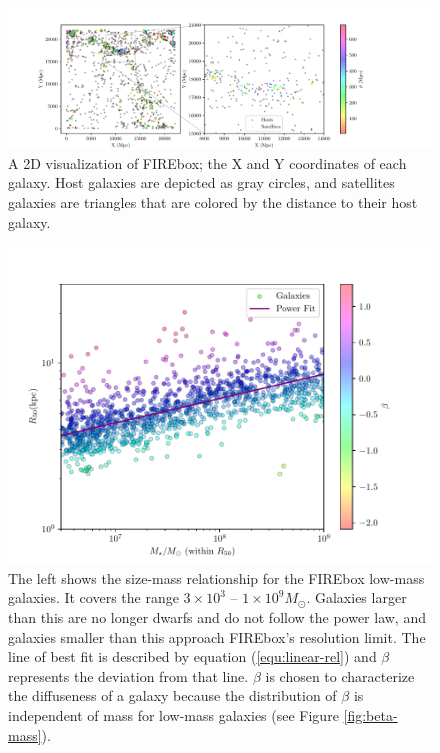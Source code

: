 \begin{figure}
    \centering
    \includegraphics*[width=\textwidth*11/10]{figs/me/locations.pdf}
    \caption*{
        A 2D visualization of FIREbox; the X and Y coordinates of each galaxy. Host galaxies are depicted as gray circles, and satellites galaxies are triangles that are colored by the distance to their host galaxy. 
    }
\end{figure}

\begin{figure}
    \centering
    \includegraphics[width=\textwidth*2/3]{figs/me/stars-mass-size-r50.pdf}
    \caption{
        The left shows the size-mass relationship for the FIREbox low-mass galaxies. It covers the range $3 \times 10^3$ -- $1 \times 10^9 M_\odot$. Galaxies larger than this are no longer dwarfs and do not follow the power law, and galaxies smaller than this approach FIREbox's resolution limit. The line of best fit is described by equation (\ref{equ:linear-rel}) and $\beta$ represents the deviation from that line. $\beta$ is chosen to characterize the diffuseness of a galaxy because the distribution of $\beta$ is independent of mass for low-mass galaxies (see Figure \ref{fig:beta-mass}).
    }
    \label{fig:size-mass}
\end{figure}


